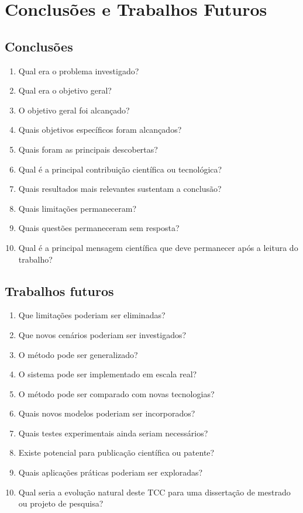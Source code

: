 
\chapter{Conclusões e Trabalhos Futuros}

\section{Conclusões}

\begin{enumerate}
	\item Qual era o problema investigado?
	\item Qual era o objetivo geral?
	\item O objetivo geral foi alcançado?
	\item Quais objetivos específicos foram alcançados?
	\item Quais foram as principais descobertas?
	\item Qual é a principal contribuição científica ou tecnológica?
	\item Quais resultados mais relevantes sustentam a conclusão?
	\item Quais limitações permaneceram?
	\item Quais questões permaneceram sem resposta?
	\item Qual é a principal mensagem científica que deve permanecer após a leitura do trabalho?
\end{enumerate}

\section{Trabalhos futuros}

\begin{enumerate}
	\item Que limitações poderiam ser eliminadas?
	\item Que novos cenários poderiam ser investigados?
	\item O método pode ser generalizado?
	\item O sistema pode ser implementado em escala real?
	\item O método pode ser comparado com novas tecnologias?
	\item Quais novos modelos poderiam ser incorporados?
	\item Quais testes experimentais ainda seriam necessários?
	\item Existe potencial para publicação científica ou patente?
	\item Quais aplicações práticas poderiam ser exploradas?
	\item Qual seria a evolução natural deste TCC para uma dissertação de mestrado ou projeto de pesquisa?
\end{enumerate}





